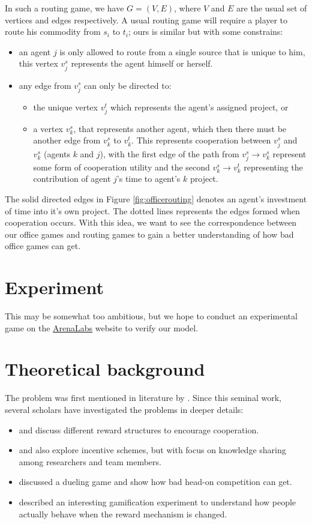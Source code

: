 \documentclass[11pt, a4paper]{article}
\begin{document}
	In such a routing game, we have $G=(V,E)$, where $V$ and $E$ are the usual set of vertices and edges respectively. A usual routing game will require a player to route his commodity from $s_i$ to $t_i$; ours is similar but with some constrains:
	\begin{itemize}
	\item an agent $j$ is only allowed to route from a single source that is unique to him, this vertex $v^s_j$ represents the agent himself or herself.
	\item any edge from $v^s_j$ can only be directed to:
	\begin{itemize}
	\item	 the unique vertex $v^t_j$ which represents the agent's assigned project, or
	\item a vertex $v^s_k$, that represents another agent, which then there must be another edge from $v^s_k$ to $v^t_k$. This represents cooperation between $v^s_j$ and $v^s_k$ (agents $k$ and $j$), with the first edge of the path from $v^s_j\to v^s_k$ represent some form of cooperation utility and the second $v^s_k\to v^t_k$ representing the contribution of agent $j$'s time to agent's $k$ project.
	\end{itemize}
	\end{itemize}
	The solid directed edges in Figure \ref{fig:officerouting} denotes an agent's investment of time into it's own project. The dotted lines represents the edges formed when cooperation occurs. With this idea, we want to see the correspondence between our office games and routing games to gain a better understanding of how bad office games can get.
	\section{Experiment} 
	This may be somewhat too ambitious, but we hope to conduct an experimental game on the \href{http://arenalabs.co/}{ArenaLabs} website to verify our model.
	
	\section{Theoretical background}
	The problem was first mentioned in literature by \cite{Drago1991}. Since this seminal work, several scholars have investigated the problems in deeper details:
	\begin{itemize}
		\item \cite{Drago1998} and \cite{Kistruck2016} discuss different reward structures to encourage cooperation.
		\item \cite{Banerjee2014} and \cite{Chakravarti2015} also explore incentive schemes, but with focus on knowledge sharing among researchers and team members.
		\item \cite{Immorlica2011} discussed a dueling game and show how bad head-on competition can get.
		\item \cite{Landers2015} described an interesting gamification experiment to understand how people actually behave when the reward mechanism is changed.		
	\end{itemize}
	\newpage
	
	
\end{document}

